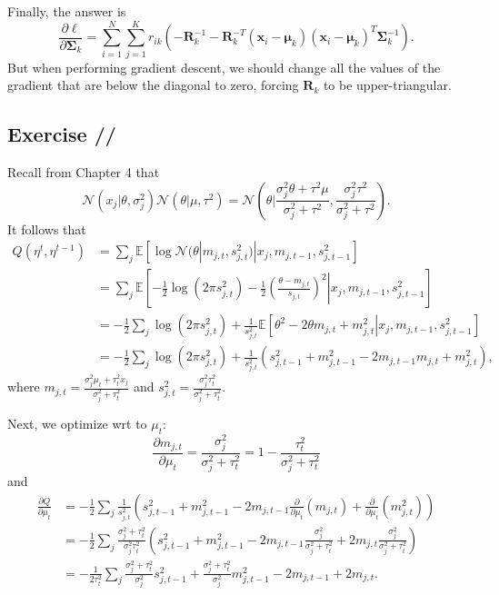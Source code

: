 \documentclass[a4paper,11pt]{article}
\newcounter{exercise}
\newcounter{subexercise}
\newcommand*{\exercise}[1][]{\subsection*{Exercise \ifx/#1/\stepcounter{exercise}\arabic{exercise}\else#1\fi}\setcounter{subexercise}{0}}
\begin{document}
Finally, the answer is
\[
    \frac{ \partial\ell }{ \partial\boldsymbol\Sigma_k } =
    \sum\limits_{i=1}^{N} \sum\limits_{j=1}^K
	r_{ik} \left(
		- \mathbf{R}^{-1}_k - \mathbf{R}^{-T}_k ( \mathbf{x}_i - \boldsymbol{\mu}_k )
        ( \mathbf{x}_i - \boldsymbol{\mu}_k )^T \boldsymbol{\Sigma}^{-1}_k
    \right).
\]
But when performing gradient descent, we should change all the values of the
gradient that are below the diagonal to zero, forcing $\mathbf{R}_k$ to be upper-triangular.

\setcounter{exercise}{12}
\exercise

Recall from Chapter 4 that
\[
    \mathcal{N}( x_j | \theta, \sigma_j^2 ) \mathcal{N}( \theta | \mu, \tau^2 )
    = \mathcal{N}\left(
        \theta
		| \frac{ \sigma_j^2 \theta + \tau^2 \mu }{ \sigma_j^2 + \tau^2 }, 
        \frac{ \sigma_j^2 \tau^2 }{ \sigma_j^2 + \tau^2 }
    \right).
\]
It follows that
\begin{align*}
    Q( \eta^t, \eta ^ { t-1 } )
    &= \sum\limits_j \mathbb{E}\left[
        \log \mathcal{N}( \theta | m_{j,t}, s_{j,t}^2 )
		| x_j, m_{j, t-1}, s_{j, t-1}^2
    \right] \\
    &= \sum\limits_j \mathbb{E}\left[\left.
         -\frac12 \log( 2 \pi s_{j,t}^2 ) -\frac12 \left(
             \frac{ \theta - m_{j,t} }{ s_{j,t} }
        \right)^2
		\right| x_j, m_{j,t-1}, s_{j,t-1}^2
    \right] \\
    &= -\frac12 \sum\limits_j 
         \log( 2 \pi s_{j,t}^2 )
		 + \frac1{ s_{j,t}^2 } \mathbb{E}\left[\left.
             \theta^2 - 2 \theta m_{j,t} + m_{j,t}^2
        \right| x_j, m_{j,t-1}, s_{j,t-1}^2
    \right] \\
    &= -\frac12 \sum\limits_j 
    \log( 2 \pi s_{j,t}^2 )
	+ \frac1{ s_{j,t}^2 } \left(
        s_{j,t-1}^2 + m_{j,t-1}^2 - 2m_{j,t-1} m_{j,t} + m_{j,t}^2
    \right),
\end{align*}
where $m_{j,t} = \frac{\sigma_j^2\mu_t + \tau_t^2x_j}{\sigma_j^2+\tau_t^2}$
and $s_{j,t}^2 = \frac{\sigma_j^2\tau_t^2}{\sigma_j^2+\tau_t^2}$.

Next, we optimize wrt to $\mu_t$:
\[
    \frac{ \partial m_{j,t} }{ \partial\mu_t } = \frac{ \sigma^2_j }{ \sigma^2_j + \tau^2_t }
    = 1 - \frac{ \tau_t^2 }{ \sigma^2_j + \tau^2_t }
\]
and
\begin{align*}
    \frac{ \partial Q }{ \partial \mu_t } &= -\frac12 \sum\limits_j 
    \frac1{s_{j,t}^2} \left(
        s_{j,t-1}^2
        + m_{j,t-1}^2
        - 2m_{j,t-1} \frac\partial{ \partial \mu_t } ( m_{j,t} )
        + \frac\partial{\partial \mu_t} \left( m_{j,t}^2 \right)
    \right) \\
    &= -\frac12 \sum\limits_j 
    \frac{ \sigma_j^2 + \tau_t^2 }{ \sigma_j^2 \tau_t^2 }\left(
        s_{j,t-1}^2
        + m_{j,t-1}^2
        - 2m_{j,t-1} \frac{ \sigma^2_j }{ \sigma^2_j + \tau^2_t }
        + 2m_{j,t} \frac{ \sigma^2_j }{ \sigma^2_j + \tau^2_t }
    \right) \\
    &= -\frac1{ 2 \tau_t^2 } \sum\limits_j 
    \frac{ \sigma_j^2 + \tau_t^2 }{ \sigma_j^2 } s_{j,t-1}^2
    + \frac{ \sigma_j^2 + \tau_t^2 }{ \sigma_j^2 } m_{j,t-1}^2
    - 2 m_{j,t-1}
    + 2 m_{j,t}.
\end{align*}
\end{document}
